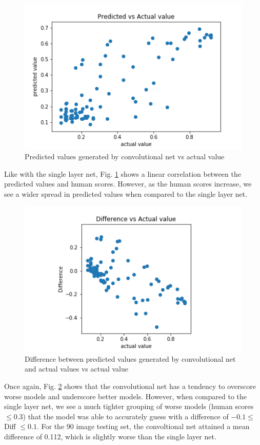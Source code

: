 \documentclass[conference]{IEEEtran}
\begin{document}
\begin{figure}[htbp]
\centerline{\includegraphics[width=0.75\linewidth]{./Images/ConvPredictedVAct.png}}
\caption{Predicted values generated by convolutional net vs actual value}
\label{fig:ConvPredictedVAct}
\end{figure}

Like with the single layer net, Fig. \ref{fig:ConvPredictedVAct} shows a linear correlation between the predicted values and human scores. However, as the human scores increase, we see a wider spread in predicted values when compared to the single layer net. 

\begin{figure}[htbp]
\centerline{\includegraphics[width=0.75\linewidth]{./Images/ConvDiffVAct.png}}
\caption{Difference between predicted values generated by convolutional net and actual values vs actual value}
\label{fig:ConvDiffVAct}
\end{figure}

Once again, Fig. \ref{fig:ConvDiffVAct} shows that the convolutional net has a tendency to overscore worse models and underscore better models. However, when compared to the single layer net, we see a much tighter grouping of worse models (human scores $\leq0.3$) that the model was able to accurately guess with a difference of $-0.1 \leq$ Diff $\leq 0.1$. For the 90 image testing set, the convoltional net attained a mean difference of 0.112, which is slightly worse than the single layer net. 
\end{document}
